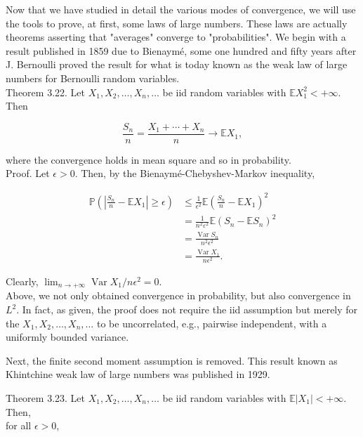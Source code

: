 \documentclass{amsbook}
\theoremstyle{plain}%
\theoremstyle{definition}
\theoremstyle{remark}
\begin{document}
  Now that we have studied in detail the various modes of convergence, we will use the tools to prove, at first, some laws of large numbers. These laws are actually theorems asserting that "averages" converge to "probabilities". We begin with a result published in 1859 due to Bienaymé, some one hundred and fifty years after J. Bernoulli proved the result for what is today known as the weak law of large numbers for Bernoulli random variables.\\
  Theorem 3.22. Let $X_{1}, X_{2}, \ldots, X_{n}, \ldots$ be iid random variables with $\mathbb{E} X_{1}^{2}<+\infty$. Then

  $$
  \frac{S_{n}}{n}=\frac{X_{1}+\cdots+X_{n}}{n} \rightarrow \mathbb{E} X_{1},
  $$

  where the convergence holds in mean square and so in probability.\\
  Proof. Let $\epsilon>0$. Then, by the Bienaymé-Chebyshev-Markov inequality,

  $$
  \begin{aligned}
    \mathbb{P}\left(\left|\frac{S_{n}}{n}-\mathbb{E} X_{1}\right| \geq \epsilon\right) & \leq \frac{1}{\epsilon^{2}} \mathbb{E}\left(\frac{S_{n}}{n}-\mathbb{E} X_{1}\right)^{2} \\
    & =\frac{1}{n^{2} \varepsilon^{2}} \mathbb{E}\left(S_{n}-\mathbb{E} S_{n}\right)^{2}      \\
    & =\frac{\operatorname{Var} S_{n}}{n^{2} \epsilon^{2}}                                    \\
    & =\frac{\operatorname{Var} X_{1}}{n \epsilon^{2}} .
  \end{aligned}
  $$

  Clearly, $\lim _{n \rightarrow+\infty} \operatorname{Var} X_{1} / n \epsilon^{2}=0$.\\
  Above, we not only obtained convergence in probability, but also convergence in $L^{2}$. In fact, as given, the proof does not require the iid assumption but merely for the $X_{1}, X_{2}, \ldots, X_{n}, \ldots$ to be uncorrelated, e.g., pairwise independent, with a uniformly bounded variance.

  Next, the finite second moment assumption is removed. This result known as Khintchine weak law of large numbers was published in 1929.

  Theorem 3.23. Let $X_{1}, X_{2}, \ldots, X_{n}, \ldots$ be iid random variables with $\mathbb{E}\left|X_{1}\right|<+\infty$. Then,\\
  for all $\epsilon>0$,
\end{document}
